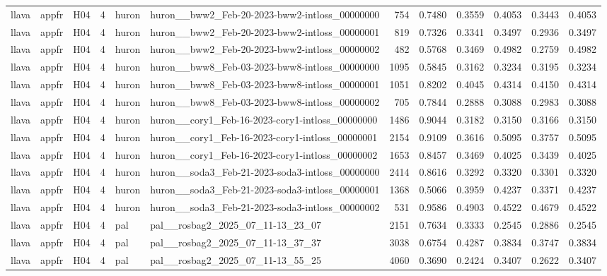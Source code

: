 \begin{table}[tbp]
\begin{tabular}{lllrllrrrrrr}
llava & appfr & H04 & 4 & huron & huron\_\_bww2\_Feb-20-2023-bww2-intloss\_00000000 & 754 & 0.7480 & 0.3559 & 0.4053 & 0.3443 & 0.4053 \\
llava & appfr & H04 & 4 & huron & huron\_\_bww2\_Feb-20-2023-bww2-intloss\_00000001 & 819 & 0.7326 & 0.3341 & 0.3497 & 0.2936 & 0.3497 \\
llava & appfr & H04 & 4 & huron & huron\_\_bww2\_Feb-20-2023-bww2-intloss\_00000002 & 482 & 0.5768 & 0.3469 & 0.4982 & 0.2759 & 0.4982 \\
llava & appfr & H04 & 4 & huron & huron\_\_bww8\_Feb-03-2023-bww8-intloss\_00000000 & 1095 & 0.5845 & 0.3162 & 0.3234 & 0.3195 & 0.3234 \\
llava & appfr & H04 & 4 & huron & huron\_\_bww8\_Feb-03-2023-bww8-intloss\_00000001 & 1051 & 0.8202 & 0.4045 & 0.4314 & 0.4150 & 0.4314 \\
llava & appfr & H04 & 4 & huron & huron\_\_bww8\_Feb-03-2023-bww8-intloss\_00000002 & 705 & 0.7844 & 0.2888 & 0.3088 & 0.2983 & 0.3088 \\
llava & appfr & H04 & 4 & huron & huron\_\_cory1\_Feb-16-2023-cory1-intloss\_00000000 & 1486 & 0.9044 & 0.3182 & 0.3150 & 0.3166 & 0.3150 \\
llava & appfr & H04 & 4 & huron & huron\_\_cory1\_Feb-16-2023-cory1-intloss\_00000001 & 2154 & 0.9109 & 0.3616 & 0.5095 & 0.3757 & 0.5095 \\
llava & appfr & H04 & 4 & huron & huron\_\_cory1\_Feb-16-2023-cory1-intloss\_00000002 & 1653 & 0.8457 & 0.3469 & 0.4025 & 0.3439 & 0.4025 \\
llava & appfr & H04 & 4 & huron & huron\_\_soda3\_Feb-21-2023-soda3-intloss\_00000000 & 2414 & 0.8616 & 0.3292 & 0.3320 & 0.3301 & 0.3320 \\
llava & appfr & H04 & 4 & huron & huron\_\_soda3\_Feb-21-2023-soda3-intloss\_00000001 & 1368 & 0.5066 & 0.3959 & 0.4237 & 0.3371 & 0.4237 \\
llava & appfr & H04 & 4 & huron & huron\_\_soda3\_Feb-21-2023-soda3-intloss\_00000002 & 531 & 0.9586 & 0.4903 & 0.4522 & 0.4679 & 0.4522 \\
llava & appfr & H04 & 4 & pal & pal\_\_rosbag2\_2025\_07\_11-13\_23\_07 & 2151 & 0.7634 & 0.3333 & 0.2545 & 0.2886 & 0.2545 \\
llava & appfr & H04 & 4 & pal & pal\_\_rosbag2\_2025\_07\_11-13\_37\_37 & 3038 & 0.6754 & 0.4287 & 0.3834 & 0.3747 & 0.3834 \\
llava & appfr & H04 & 4 & pal & pal\_\_rosbag2\_2025\_07\_11-13\_55\_25 & 4060 & 0.3690 & 0.2424 & 0.3407 & 0.2622 & 0.3407 \\

\end{tabular}
\end{table}
